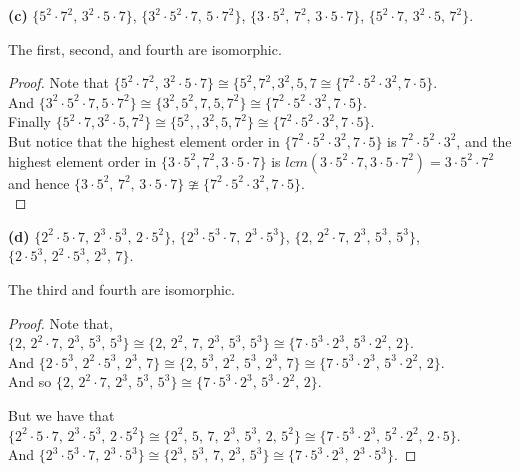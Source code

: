 \documentclass[10pt]{article}
\begin{document}
\begin{itemize}
\textbf{(c)} $\{5^{2}\cdot7^{2},\,3^{2}\cdot5\cdot7\}$, $\{3^{2}\cdot5^{2}\cdot7,\,5\cdot7^{2}\}$,
$\{3\cdot5^{2},\,7^{2},\,3\cdot5\cdot7\}$, $\{5^{2}\cdot7,\,3^{2}\cdot5,\,7^{2}\}$.  

The first, second, and fourth are isomorphic.

\begin{proof} Note that $ $$\{5^{2}\cdot7^{2},\,3^{2}\cdot5\cdot7\}\cong\{5^{2},7^{2},3^{2},5,7\cong\{7^{2}\cdot5^{2}\cdot3^{2},7\cdot5\}$.\\
And $\{3^{2}\cdot5^{2}\cdot7,5\cdot7^{2}\}\cong\{3^{2},5^{2},7,5,7^{2}\}\cong\{7^{2}\cdot5^{2}\cdot3^{2},7\cdot5\}$.\\
Finally $\{5^{2}\cdot7,3^{2}\cdot5,7^{2}\}\cong\{5^{2},,3^{2},5,7^{2}\}\cong\{7^{2}\cdot5^{2}\cdot3^{2},7\cdot5\}$.\\
But notice that the highest element order in $\{7^{2}\cdot5^{2}\cdot3^{2},7\cdot5\}$
is $7^{2}\cdot5^{2}\cdot3^{2}$, and the highest element order in
$\{3\cdot5^{2},7^{2},3\cdot5\cdot7\}$ is $lcm(3\cdot5^{2}\cdot7,3\cdot5\cdot7^{2})=3\cdot5^{2}\cdot7^{2}$
and hence $\{3\cdot5^{2},\,7^{2},\,3\cdot5\cdot7\}\ncong\{7^{2}\cdot5^{2}\cdot3^{2},7\cdot5\}$.\\
\end{proof}

\textbf{(d)} $\{2^{2}\cdot5\cdot7,\,2^{3}\cdot5^{3},\,2\cdot5^{2}\}$,
$\{2^{3}\cdot5^{3}\cdot7,\,2^{3}\cdot5^{3}\}$, $\{2,\,2^{2}\cdot7,\,2^{3},\,5^{3},\,5^{3}\}$,
$\{2\cdot5^{3},\,2^{2}\cdot5^{3},\,2^{3},\,7\}$.

The third and fourth are isomorphic.

\begin{proof} 

Note that, $\{2,\,2^{2}\cdot7,\,2^{3},\,5^{3},\,5^{3}\}\cong\{2,\,2^{2},\,7,\,2^{3},\,5^{3},\,5^{3}\}\cong\{7\cdot5^{3}\cdot2^{3},\,5^{3}\cdot2^{2},\,2\}$.\\
And $\{2\cdot5^{3},\,2^{2}\cdot5^{3},\,2^{3},\,7\}\cong\{2,\,5^{3},\,2^{2},\,5^{3},\,2^{3},\,7\}\cong\{7\cdot5^{3}\cdot2^{3},\,5^{3}\cdot2^{2},\,2\}$.
\\
And so $\{2,\,2^{2}\cdot7,\,2^{3},\,5^{3},\,5^{3}\}\cong\{7\cdot5^{3}\cdot2^{3},\,5^{3}\cdot2^{2},\,2\}$.

But we have that $\{2^{2}\cdot5\cdot7,\,2^{3}\cdot5^{3},\,2\cdot5^{2}\}\cong\{2^{2},\,5,\,7,\,2^{3},\,5^{3},\,2,\,5^{2}\}\cong\{7\cdot5^{3}\cdot2^{3},\,5^{2}\cdot2^{2},\,2\cdot5\}$.\\
And $\{2^{3}\cdot5^{3}\cdot7,\,2^{3}\cdot5^{3}\}\cong\{2^{3},\,5^{3},\,7,\,2^{3},\,5^{3}\}\cong\{7\cdot5^{3}\cdot2^{3},\,2^{3}\cdot5^{3}\}$.


\end{proof}
\end{itemize}
\end{document}
